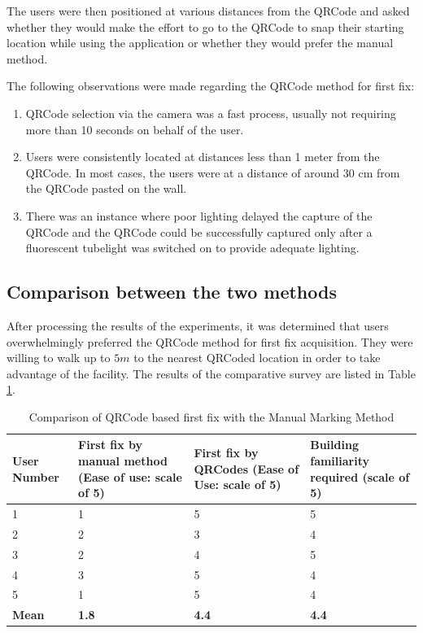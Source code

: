 The users were then positioned at various distances from the QRCode and 
asked whether they would make the effort to go to the QRCode to snap their
starting location while using the application or whether they would prefer
the manual method.

The following observations were made regarding the QRCode method for first
fix:

\begin{enumerate}
\item QRCode selection via the camera was a fast process, usually not requiring
    more than 10 seconds on behalf of the user.
\item Users were consistently located at distances less than 1 meter from 
    the QRCode. In most cases, the users were at a distance of around 30 cm 
    from the QRCode pasted on the wall. 
\item There was an instance where poor lighting delayed the capture of the
    QRCode and the QRCode could be successfully captured only after a 
    fluorescent tubelight was switched on to provide adequate lighting.
\end{enumerate}

\subsection{Comparison between the two methods}

After processing the results of the experiments, it was determined that 
users overwhelmingly preferred the QRCode method for first fix acquisition.
They were willing to walk up to $5 m$ to the nearest QRCoded location in 
order to take advantage of the facility. The results of the comparative 
survey are listed in Table \ref{tbl:QRCode_comparison_survey}.

\begin{table}
\centering
\begin{tabular}{p{0.8in} p{0.8in} p{0.8in} p{0.8in}}
\hline
\hline
User Number & First fix by manual method (Ease of use: scale of 5) & First fix by QRCodes (Ease of Use: scale of 5) & Building familiarity required (scale of 5) \\
\hline 
1 & 1 & 5 & 5 \\
2 & 2 & 3 & 4 \\ 
3 & 2 & 4 & 5 \\
4 & 3 & 5 & 4 \\
5 & 1 & 5 & 4 \\
\hline
{\bf Mean} & {\bf 1.8} & {\bf 4.4} & {\bf 4.4} \\
\hline
\end{tabular}
\caption{Comparison of QRCode based first fix with the Manual Marking Method\label{tbl:QRCode_comparison_survey}}
\end{table}

